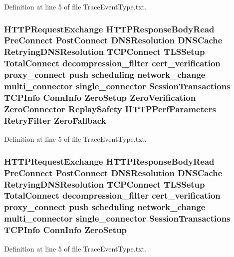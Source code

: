Definition at line 5 of file Trace\+Event\+Type.\+txt.

\subsubsection[{Zero\+Fallback}]{ H\+T\+T\+P\+Request\+Exchange H\+T\+T\+P\+Response\+Body\+Read {\bf Pre\+Connect} {\bf Post\+Connect} D\+N\+S\+Resolution D\+N\+S\+Cache Retrying\+D\+N\+S\+Resolution T\+C\+P\+Connect T\+L\+S\+Setup {\bf Total\+Connect} decompression\+\_\+filter cert\+\_\+verification proxy\+\_\+connect push scheduling network\+\_\+change multi\+\_\+connector single\+\_\+connector {\bf Session\+Transactions} {\bf T\+C\+P\+Info} {\bf Conn\+Info} {\bf Zero\+Setup} {\bf Zero\+Verification} {\bf Zero\+Connector} {\bf Replay\+Safety} {\bf H\+T\+T\+P\+Perf\+Parameters} {\bf Retry\+Filter} Zero\+Fallback}\label{TraceEventType_8txt_a45227ec3a1b19c76dfc481edeeb0c627}


Definition at line 5 of file Trace\+Event\+Type.\+txt.

\subsubsection[{Zero\+Setup}]{ H\+T\+T\+P\+Request\+Exchange H\+T\+T\+P\+Response\+Body\+Read {\bf Pre\+Connect} {\bf Post\+Connect} D\+N\+S\+Resolution D\+N\+S\+Cache Retrying\+D\+N\+S\+Resolution T\+C\+P\+Connect T\+L\+S\+Setup {\bf Total\+Connect} decompression\+\_\+filter cert\+\_\+verification proxy\+\_\+connect push scheduling network\+\_\+change multi\+\_\+connector single\+\_\+connector {\bf Session\+Transactions} {\bf T\+C\+P\+Info} {\bf Conn\+Info} Zero\+Setup}\label{TraceEventType_8txt_a88c531fa249fdebf647fe7997955f6e2}


Definition at line 5 of file Trace\+Event\+Type.\+txt.

